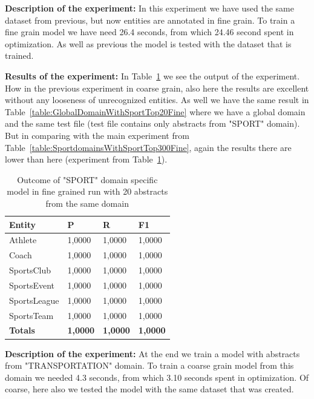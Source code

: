 \documentclass[thesis=M,english]{FITthesis}[2018/05/30]
\begin{document}
\textbf{Description of the experiment:} In this experiment we have used the same dataset from previous, but now entities are annotated in fine grain. To train a fine grain model we have need 26.4 seconds, from which 24.46 second spent in optimization. As well as previous the model is tested with the dataset that is trained.

\textbf{Results of the experiment:} In Table~\ref{table:SportDomainWithSportTop20Fine} we see the output of the experiment. How in the previous experiment in coarse grain, also here the results are excellent without any looseness of unrecognized entities. As well we have the same result in Table~\ref{table:GlobalDomainWithSportTop20Fine} where we have a global domain and the same test file (test file contains only abstracts from "SPORT" domain). But in comparing with the main experiment from Table~\ref{table:SportdomainsWithSportTop300Fine}, again the results there are lower than here (experiment from Table~\ref{table:SportDomainWithSportTop20Fine}).   

	\begin{table}[H]\centering
		\begin{tabular}{|l|l|l|l|}
			\hline {\textbf{Entity}} & {\textbf{P}} & {\textbf{R}} & {\textbf{F1}}\\\hline
				Athlete & 1,0000 & 1,0000 & 1,0000\\
				Coach & 1,0000 & 1,0000 & 1,0000\\
				SportsClub & 1,0000 & 1,0000 & 1,0000\\
				SportsEvent & 1,0000 & 1,0000 & 1,0000\\
				SportsLeague & 1,0000 & 1,0000 & 1,0000\\
				SportsTeam & 1,0000 & 1,0000 & 1,0000\\\hline
				\textbf{Totals} & \textbf{1,0000} & \textbf{1,0000} & \textbf{1,0000}\\\hline
		\end{tabular}
		\caption{Outcome of "SPORT" domain specific model in fine grained run with 20 abstracts from the same domain \label{table:SportDomainWithSportTop20Fine}}			
	\end{table}	
	
	
\textbf{Description of the experiment:} At the end we train a model with abstracts from "TRANSPORTATION" domain. To train a coarse grain model from this domain we needed 4.3 seconds, from which 3.10 seconds spent in optimization. Of coarse, here also we tested the model with the same dataset that was created. 
\end{document}
